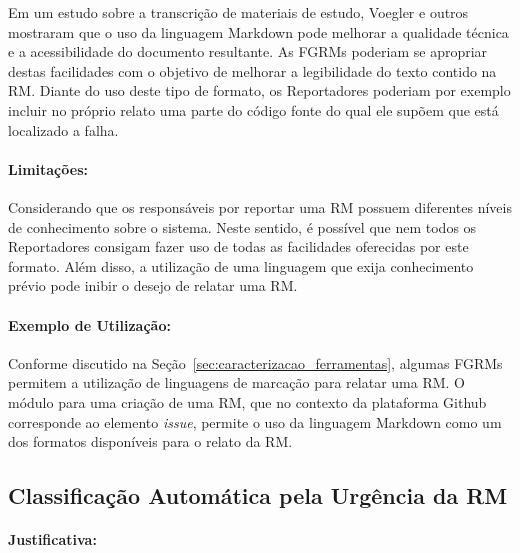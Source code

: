 Em um estudo sobre a transcrição de materiais de estudo, Voegler e
outros~\cite{voegler2014markdown} mostraram que o uso da linguagem Markdown pode
melhorar a qualidade técnica e a acessibilidade do documento resultante. As
FGRMs poderiam se apropriar destas facilidades com o objetivo de melhorar a
legibilidade do texto contido na RM\@. Diante do uso deste tipo de formato, os
Reportadores poderiam por exemplo incluir no próprio relato uma parte do código
fonte do qual ele supõem que está localizado a falha.

\paragraph{Limitações:}
\label{par:limitacoes_s06}

Considerando que os responsáveis por reportar uma RM possuem diferentes níveis
de conhecimento sobre o sistema. Neste sentido, é possível que nem todos os
Reportadores consigam fazer uso de todas as facilidades oferecidas por este
formato. Além disso, a utilização de uma linguagem que exija conhecimento
prévio pode inibir o desejo de relatar uma RM\@.

\paragraph{Exemplo de Utilização:}
\label{par:exemplo_de_utilização_s06}

Conforme discutido na Seção~\ref{sec:caracterizacao_ferramentas}, algumas FGRMs
permitem a utilização de linguagens de marcação para relatar uma RM\@. O módulo
para uma criação de uma RM, que no contexto da plataforma Github corresponde ao
elemento \textit{issue}, permite o uso da linguagem Markdown como um dos
formatos disponíveis para o relato da RM\@.

\subsection{Classificação Automática pela Urgência da RM}
\label{sub:priorizacao_automatica_rms}


\paragraph{Justificativa:}
\label{par:justificativa_s07}

